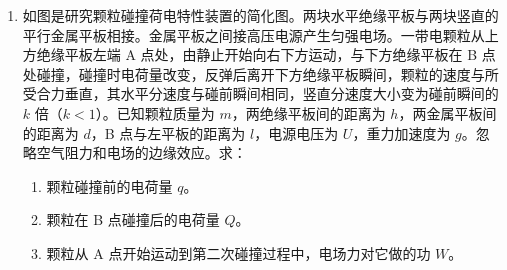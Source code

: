\documentclass[\gkver]{gaokaozhenti}
\begin{document}
\begin{enumerate}
{（2）根据题意画出木塞摩擦力与运动距离的关系图如图所示。

\onepicture[w=2.78cm]{}

可得摩擦力对木塞所做的功为 $W_{f} = - \frac{1}{2}f_{0}h$

对木塞，根据动能定理

$W + W_{f} - mgh - \Delta pSh = \frac{1}{2}mv^{2} - 0$

解得 $W = mah + mgh + \frac{1}{2}f_{0}h + \Delta pSh$

（3）设开瓶器对木塞的作用力为 $F$，对木塞，根据牛顿第二定律 $F - mg - f - \Delta pS = ma$

速度 $v = at$

位移 $x = \frac{1}{2}at^{2}$

开瓶器的功率 $P = Fv$

联立可得 $P = magt + ma^{2}t + \Delta pSat + f_{0}at - \frac{f_{0}a^{3}t^{3}}{2h}$
}

\item
如图是研究颗粒碰撞荷电特性装置的简化图。两块水平绝缘平板与两块竖直的平行金属平板相接。金属平板之间接高压电源产生匀强电场。一带电颗粒从上方绝缘平板左端 A 点处，由静止开始向右下方运动，与下方绝缘平板在 B 点处碰撞，碰撞时电荷量改变，反弹后离开下方绝缘平板瞬间，颗粒的速度与所受合力垂直，其水平分速度与碰前瞬间相同，竖直分速度大小变为碰前瞬间的 $k$ 倍（$k < 1$）。已知颗粒质量为 $m$，两绝缘平板间的距离为 $h$，两金属平板间的距离为 $d$，B 点与左平板的距离为 $l$，电源电压为 $U$，重力加速度为 $g$。忽略空气阻力和电场的边缘效应。求：

\begin{enumerate}
\item
颗粒碰撞前的电荷量 $q$。
\item
颗粒在 B 点碰撞后的电荷量 $Q$。
\item
颗粒从 A 点开始运动到第二次碰撞过程中，电场力对它做的功 $W$。
\end{enumerate}


\end{enumerate}
\end{document}
